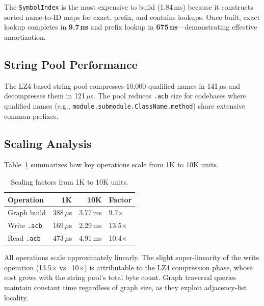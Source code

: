 \documentclass[10pt, twocolumn]{article}
\newcommand{\acbfile}{\texttt{.acb}\xspace}
\begin{document}
The \texttt{SymbolIndex} is the most expensive to build (1.84\,ms) because it constructs sorted name-to-ID maps for exact, prefix, and contains lookups. Once built, exact lookup completes in \textbf{9.7\,ns} and prefix lookup in \textbf{675\,ns}---demonstrating effective amortization.


\subsection{String Pool Performance}

The LZ4-based string pool compresses 10{,}000 qualified names in 141\,$\mu$s and decompresses them in 121\,$\mu$s. The pool reduces \acbfile size for codebases where qualified names (e.g., \texttt{module.submodule.ClassName.method}) share extensive common prefixes.

\subsection{Scaling Analysis}

Table~\ref{tab:scaling} summarizes how key operations scale from 1K to 10K units.

\begin{table}[t]
\caption{Scaling factors from 1K to 10K units.}
\label{tab:scaling}
\centering
\small
\begin{tabular}{@{}lrrl@{}}
\toprule
\textbf{Operation} & \textbf{1K} & \textbf{10K} & \textbf{Factor} \\
\midrule
Graph build    & 388\,$\mu$s & 3.77\,ms & 9.7$\times$ \\
Write \acbfile & 169\,$\mu$s & 2.29\,ms & 13.5$\times$ \\
Read \acbfile  & 473\,$\mu$s & 4.91\,ms & 10.4$\times$ \\
\bottomrule
\end{tabular}
\end{table}

All operations scale approximately linearly. The slight super-linearity of the write operation (13.5$\times$ vs.\ 10$\times$) is attributable to the LZ4 compression phase, whose cost grows with the string pool's total byte count. Graph traversal queries maintain constant time regardless of graph size, as they exploit adjacency-list locality.
\end{document}
